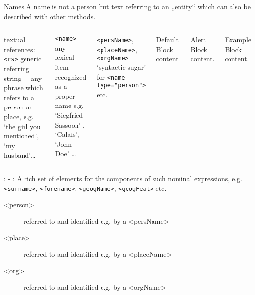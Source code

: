 
\begin{frame}{Names}
  A name is not a person
but text referring to an „entity“ which can also be described with other methods.

  \begin{columns}[T,onlytextwidth]
      \begin{block}{textual references: \texttt{<rs>}}
        generic referring string = any phrase which refers to a person or place, e.g. ‘the girl you mentioned’, ‘my husband’\dots
      \end{block}

      \begin{alertblock}{\texttt{<name>}}
        any lexical item recognized as a proper name e.g. ‘Siegfried Sassoon’ , ‘Calais’, ‘John Doe’ \dots
      \end{alertblock}

      \begin{exampleblock}{\texttt{<persName>}, \texttt{<placeName>}, \texttt{<orgName>}}
       ‘syntactic sugar’ for \texttt{<name type="person">} etc. 
      \end{exampleblock}



      \begin{block}{Default}
        Block content.
      \end{block}

      \begin{alertblock}{Alert}
        Block content.
      \end{alertblock}

      \begin{exampleblock}{Example}
        Block content.
      \end{exampleblock}

  \end{columns}
\end{frame}


: 
 - 
: 
A rich set of elements for the components of such nominal expressions, e.g. \texttt{<surname>}, \texttt{<forename>}, \texttt{<geogName>}, \texttt{<geogFeat>} etc.

\begin{description}
\item[<person>] referred to and identified e.g. by a <persName>
\item[<place>] referred to and identified e.g. by a <placeName>
\item[<org>] referred to and identified e.g. by a <orgName>
\end{description}

